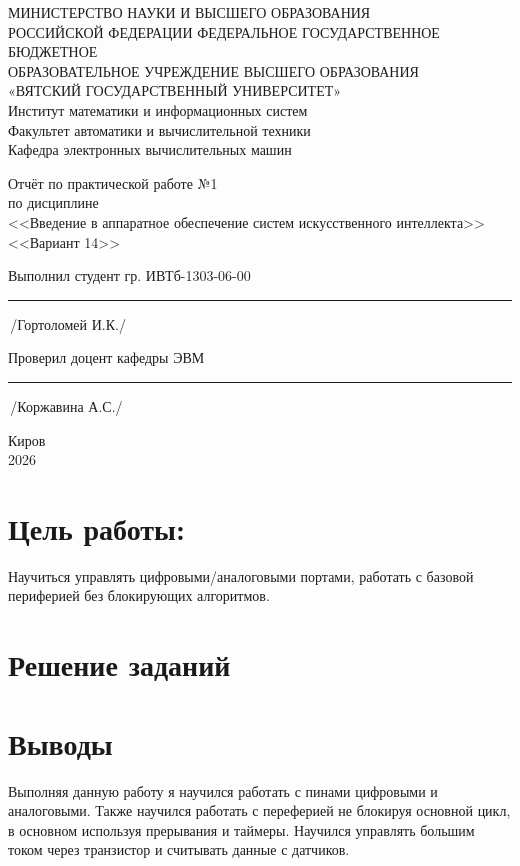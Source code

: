 \documentclass[oneside,a4paper,14pt]{extarticle} %
\begin{document}
	\newpage\thispagestyle{empty}
	\begin{center}
		МИНИСТЕРСТВО НАУКИ И ВЫСШЕГО ОБРАЗОВАНИЯ\\
			РОССИЙСКОЙ ФЕДЕРАЦИИ
			ФЕДЕРАЛЬНОЕ ГОСУДАРСТВЕННОЕ БЮДЖЕТНОЕ\\
			ОБРАЗОВАТЕЛЬНОЕ
			УЧРЕЖДЕНИЕ ВЫСШЕГО ОБРАЗОВАНИЯ\\
			«ВЯТСКИЙ ГОСУДАРСТВЕННЫЙ УНИВЕРСИТЕТ»\\
			Институт математики и информационных систем\\
			Факультет автоматики и вычислительной техники\\
			Кафедра электронных вычислительных машин
	\end{center}
	\vspace{20mm}

	\begin{center}
		Отчёт по практической работе №1\\
		по дисциплине\\
		<<Введение в аппаратное обеспечение систем искусственного интеллекта>>\\
		<<Вариант 14>>\\
	\end{center}
	\vspace{48mm}

	Выполнил студент гр. ИВТб-1303-06-00 \hspace{10mm} \rule[-0,5mm]{23mm}{0.15mm}\,/Гортоломей И.К./


	Проверил доцент кафедры ЭВМ \hfill  \rule[-0,5mm]{30mm}{0.15mm}\,/Коржавина А.С./

	\vfill
	\begin{center}
		Киров\\
		2026
	\end{center}

	\newpage%

	\section*{Цель работы:} Научиться управлять цифровыми/аналоговыми портами, работать с базовой периферией без блокирующих алгоритмов.


	\section*{Решение заданий}
	

	\section*{Выводы} Выполняя данную работу я научился работать с пинами цифровыми и аналоговыми. Также научился работать с переферией не блокируя основной цикл, в основном используя прерывания и таймеры. Научился управлять большим током через транзистор и считывать данные с датчиков.
\end{document}
